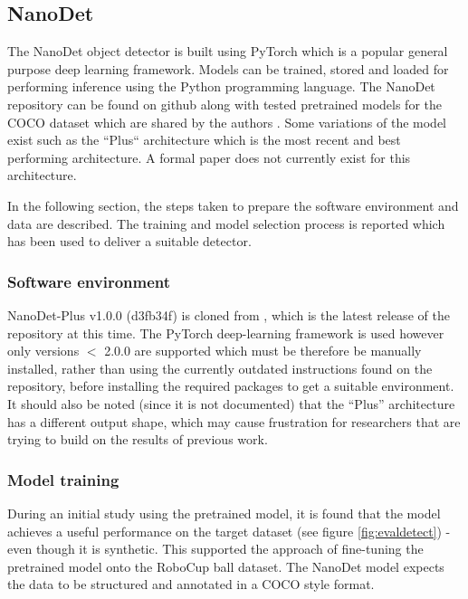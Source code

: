\documentclass[a4paper,twoside,12pt]{report}
\begin{document}
\subsection{NanoDet}

The NanoDet object detector is built using PyTorch which is a popular general purpose deep learning framework. Models can be trained, stored and loaded for performing inference using the Python programming language. The NanoDet repository can be found on github along with tested pretrained models for the COCO dataset which are shared by the authors \citep{nanodet}. Some variations of the model exist such as the ``Plus`` architecture which is the most recent and best performing architecture. A formal paper does not currently exist for this architecture.

In the following section, the steps taken to prepare the software environment and data are described. The training and model selection process is reported which has been used to deliver a suitable detector.

\subsubsection{Software environment}

NanoDet-Plus v1.0.0 (d3fb34f) is cloned from \cite{nanodet}, which is the latest release of the repository at this time. The PyTorch deep-learning framework is used however only versions $<$ 2.0.0 are supported which must be therefore be manually installed, rather than using the currently outdated instructions found on the repository, before installing the required packages to get a suitable environment. It should also be noted (since it is not documented) that the ``Plus'' architecture has a different output shape, which may cause frustration for researchers that are trying to build on the results of previous work.

\subsubsection{Model training}

During an initial study using the pretrained model, it is found that the model achieves a useful performance on the target dataset (see figure \ref{fig:evaldetect}) - even though it is synthetic. This supported the approach of fine-tuning the pretrained model onto the RoboCup ball dataset. The NanoDet model expects the data to be structured and annotated in a COCO style format. 
\end{document}
